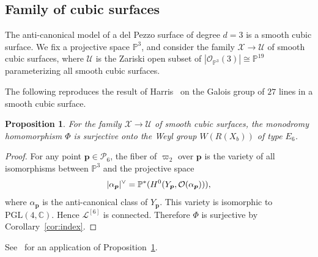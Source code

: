 \documentclass{math}
\theoremstyle{plain}
\newtheorem{proposition}[theorem]{Proposition}
\numberwithin{equation}{section}
\newcommand{\CC}{\mathord{\mathbb C}}
\newcommand{\PP}{\mathord{\mathbb  P}}
\newcommand{\LLL}{\mathord{\mathcal L}}
\newcommand{\OOO}{\mathord{\mathcal O}}
\newcommand{\PPP}{\mathord{\mathcal P}}
\newcommand{\UUU}{\mathord{\mathcal U}}
\newcommand{\XXX}{\mathord{\mathcal X}}
\newcommand{\dual}{\sp{\vee}}
\newcommand{\PGL}{\mathord{\mathrm{PGL}}}
\newcommand{\mon}{\Phi}
\newcommand{\LLn}[1]{\LLL^{[#1]}}
\newcommand{\bp}{\bm{p}}
\begin{document}
\subsection{Family of cubic surfaces}\label{subsec:cubic}
%
The anti-canonical model of a del Pezzo surface of degree $d=3$
is a smooth cubic surface.
We fix a projective space $\PP^3$,
and consider the family $\XXX\to \UUU$ of smooth cubic surfaces, where 
$\UUU$ is  the Zariski open subset of 
$|\OOO_{\PP^3} (3)|\cong \PP^{19}$
parameterizing all smooth cubic surfaces.
\par
The following reproduces the result of Harris~\cite{Harris1979}  on the Galois group of $27$ lines in a smooth cubic surface.
%
\begin{proposition}\label{prop:WE6}
For the  family 
 $\XXX\to \UUU$ 
 of smooth cubic surfaces,
 the monodromy homomorphism $\mon$  %
 is surjective onto the Weyl group $W(R(X_b))$ 
 of type $E_6$.
\end{proposition}
%
\begin{proof}
For any point $\bp\in \PPP_6$,
the fiber of $\varpi_2$ over $\bp$ is 
the variety of all isomorphisms between $\PP^3$
and the projective space 
\[
|\alpha_{\bp}|\dual=\PP^{*}(H^0(Y_{\bp}, \OOO(\alpha_{\bp}))),
\]
where $\alpha_{\bp}$ is the anti-canonical class of $Y_{\bp}$.
This variety is isomorphic to $\PGL(4, \CC)$.
Hence $\LLn{6}$ is connected.
Therefore $\mon$ is surjective by Corollary~\ref{cor:index}.
\end{proof}
%
See~\cite{Shimada2026} for an application of Proposition~\ref{prop:WE6}.
%
\end{document}
